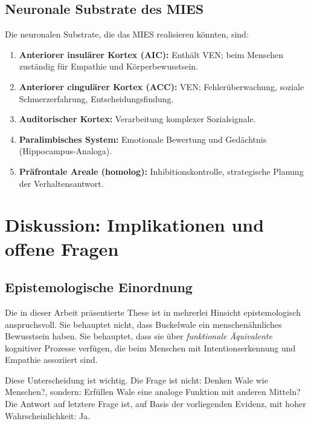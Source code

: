 ﻿\documentclass[12pt,a4paper]{article}
\theoremstyle{definition}
\theoremstyle{remark}
\begin{document}
\subsection{Neuronale Substrate des MIES}

Die neuronalen Substrate, die das MIES realisieren könnten, sind:

\begin{enumerate}
  \item \textbf{Anteriorer insulärer Kortex (AIC):} Enthält VEN; beim Menschen
        zuständig für Empathie und Körperbewusstsein.
  \item \textbf{Anteriorer cingulärer Kortex (ACC):} VEN; Fehlerüberwachung,
        soziale Schmerzerfahrung, Entscheidungsfindung.
  \item \textbf{Auditorischer Kortex:} Verarbeitung komplexer Sozialsignale.
  \item \textbf{Paralimbisches System:} Emotionale Bewertung und Gedächtnis
        (Hippocampus-Analoga).
  \item \textbf{Präfrontale Areale (homolog):} Inhibitionskontrolle,
        strategische Planung der Verhaltensantwort.
\end{enumerate}

\section{Diskussion: Implikationen und offene Fragen}
\label{sec:diskussion}

\subsection{Epistemologische Einordnung}

Die in dieser Arbeit präsentierte These ist in mehrerlei Hinsicht epistemologisch
anspruchsvoll. Sie behauptet nicht, dass Buckelwale ein menschenähnliches
Bewusstsein haben. Sie behauptet, dass sie über \emph{funktionale Äquivalente}
kognitiver Prozesse verfügen, die beim Menschen mit Intentionserkennung und
Empathie assoziiert sind.

Diese Unterscheidung ist wichtig. Die Frage ist nicht: Denken Wale wie
Menschen?, sondern: Erfüllen Wale eine analoge Funktion mit anderen
Mitteln? Die Antwort auf letztere Frage ist, auf Basis der vorliegenden Evidenz,
mit hoher Wahrscheinlichkeit: Ja.
\end{document}
